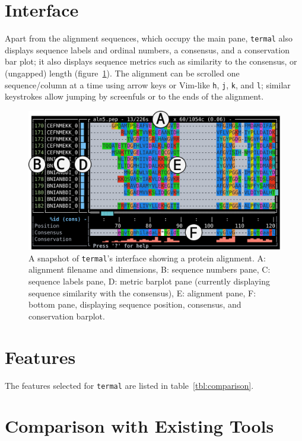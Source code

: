 \documentclass[11pt]{article}
\begin{document}
\section*{Interface}

Apart from the alignment sequences, which occupy the main pane, \texttt{termal}
also displays sequence labels and  ordinal numbers, a consensus, and a
conservation bar plot; it also displays sequence metrics such as similarity to
the consensus, or (ungapped) length (figure~\ref{fig:screen}). The alignment can
be scrolled one sequence/column at a time using arrow keys or Vim-like
\texttt{h}, \texttt{j}, \texttt{k}, and \texttt{l}; similar keystrokes allow
jumping by screenfuls or to the ends of the alignment.

\begin{figure}[htbp]
\centering
	\includegraphics[width=\textwidth]{figure-1.pdf}
\caption{%
	A snapshot of \texttt{termal}'s interface showing a protein alignment. A:
	alignment filename and dimensions, B: sequence numbers pane, C: sequence
	labels pane, D: metric barplot pane (currently displaying sequence similarity
	with the consensus), E: alignment pane, F: bottom pane, displaying sequence
	position, consensus, and conservation barplot.
	}
	\label{fig:screen}
\end{figure}


\section*{Features}

The features selected for \texttt{termal} are listed in table~\ref{tbl:comparison}.

\section*{Comparison with Existing Tools}
\end{document}
